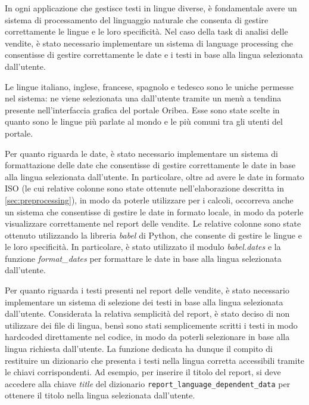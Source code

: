 In ogni applicazione che gestisce testi in lingue diverse, è fondamentale avere un sistema di processamento del linguaggio naturale che consenta di gestire correttamente le lingue e le loro specificità. Nel caso della task di analisi delle vendite, è stato necessario implementare un sistema di language processing che consentisse di gestire correttamente le date e i testi in base alla lingua selezionata dall'utente.

Le lingue italiano, inglese, francese, spagnolo e tedesco sono le uniche permesse nel sistema: ne viene selezionata una dall'utente tramite un menù a tendina presente nell'interfaccia grafica del portale Oribea. Esse sono state scelte in quanto sono le lingue più parlate al mondo e le più comuni tra gli utenti del portale.

Per quanto riguarda le date, è stato necessario implementare un sistema di formattazione delle date che consentisse di gestire correttamente le date in base alla lingua selezionata dall'utente. In particolare, oltre ad avere le date in formato ISO (le cui relative colonne sono state ottenute nell'elaborazione descritta in \ref{sec:preprocessing}), in modo da poterle utilizzare per i calcoli, occorreva anche un sistema che consentisse di gestire le date in formato locale, in modo da poterle visualizzare correttamente nel report delle vendite.
Le relative colonne sono state ottenuto utilizzando la libreria \emph{babel} di Python, che consente di gestire le lingue e le loro specificità. In particolare, è stato utilizzato il modulo \emph{babel.dates} e la funzione \emph{format\_dates} per formattare le date in base alla lingua selezionata dall'utente.

Per quanto riguarda i testi presenti nel report delle vendite, è stato necessario implementare un sistema di selezione dei testi in base alla lingua selezionata dall'utente. Considerata la relativa semplicità del report, è stato deciso di non utilizzare dei file di lingua, bensì sono stati semplicemente scritti i testi in modo hardcoded direttamente nel codice, in modo da poterli selezionare in base alla lingua richiesta dall'utente.
La funzione dedicata ha dunque il compito di restituire un dizionario che presenta i testi nella lingua corretta accessibili tramite le chiavi corrispondenti. Ad esempio, per inserire il titolo del report, si deve accedere alla chiave \emph{title} del dizionario \texttt{report\_language\_dependent\_data} per ottenere il titolo nella lingua selezionata dall'utente.


